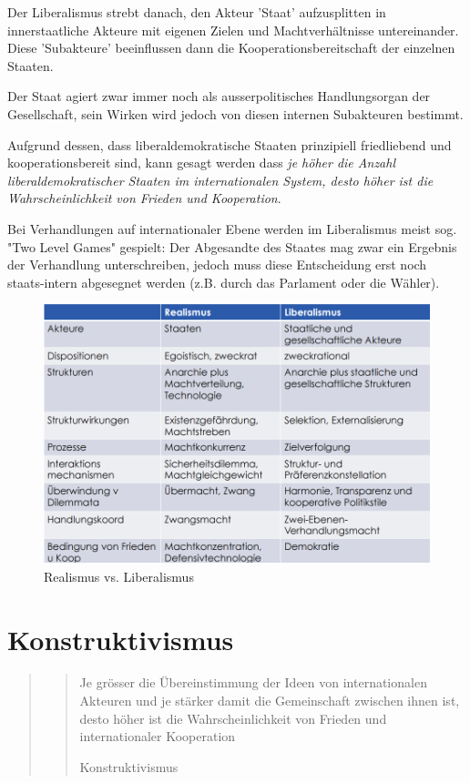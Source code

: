 \documentclass[a4paper, 11pt]{article}
\begin{document}
\noindent Der Liberalismus strebt danach, den Akteur 'Staat' aufzusplitten in innerstaatliche Akteure mit eigenen Zielen und Machtverhältnisse untereinander. Diese 'Subakteure' beeinflussen dann die Kooperationsbereitschaft der einzelnen Staaten. 

Der Staat agiert zwar immer noch als ausserpolitisches Handlungsorgan der Gesellschaft, sein Wirken wird jedoch von diesen internen Subakteuren bestimmt.

Aufgrund dessen, dass liberaldemokratische Staaten prinzipiell friedliebend und kooperationsbereit sind, kann gesagt werden dass \textit{je höher die Anzahl liberaldemokratischer Staaten im internationalen System, desto höher ist die Wahrscheinlichkeit von Frieden und Kooperation}.

\vspace{10px}

\noindent Bei Verhandlungen auf internationaler Ebene werden im Liberalismus meist sog. "Two Level Games" gespielt: Der Abgesandte des Staates mag zwar ein Ergebnis der Verhandlung unterschreiben, jedoch muss diese Entscheidung erst noch staats-intern abgesegnet werden (z.B. durch das Parlament oder die Wähler).

\begin{figure}[htb]
	\centering
	\includegraphics[keepaspectratio=true,height=20\baselineskip]{RealismusVsLiberalismus.png}
	\caption{Realismus vs. Liberalismus}
	\label{fig:realismusvsliberalismus}
\end{figure}

\section{Konstruktivismus}
\begin{quote}
	\centering
	\blockquote[Konstruktivismus]{Je grösser die Übereinstimmung der Ideen von internationalen Akteuren und je stärker damit die Gemeinschaft zwischen ihnen ist, desto höher ist die Wahrscheinlichkeit von Frieden und internationaler Kooperation}
\end{quote}
\end{document}
